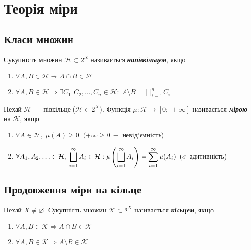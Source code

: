 \newpage
\section{\Large{Теорія міри}}

\subsection{\large{Класи множин}}
\begin{definition}
    Сукупність множин $\mathcal{H} \subset 2^X $ називається \textcolor{NavyBlue}{\textbf{\textit{напівкільцем}}}, якщо
    \begin{enumerate}
        \item $\forall A, B \in \mathcal{H} \Rightarrow  A \cap B \in \mathcal{H}$
        \item $\forall A, B \in \mathcal{H} \Rightarrow \exists C_1, C_2, \dots ,C_n \in \mathcal{H}: \; A \setminus B = \displaystyle\bigsqcup\limits_{i = 1}^n C_i$
    \end{enumerate}
\end{definition}


\begin{definition}
    Нехай $\mathcal{H}\:-$ півкільце ($\mathcal{H} \subset 2^X$). Функція $\mu:\mathcal{H} \rightarrow [0; \: + \infty] $ називається  
    \textcolor{NavyBlue}{\textbf{\textit{мірою}}} на $\mathcal{H}$, якщо
    \begin{enumerate}
        \item $\forall A \in \mathcal{H}, \; \mu (A) \geqslant 0 \;\; (+\infty \geqslant 0 \: -$ невід'ємність)  
        \item $\forall A_1, A_2, .\,.\,. \in \mathcal{H}, \; \displaystyle\bigsqcup\limits_{i = 1}^\infty  A_i \in \mathcal{H}: \mu\left(\displaystyle\bigsqcup\limits_{i = 1}^\infty  A_i\right) =  \displaystyle\sum\limits_{i=1}^{\infty} \mu (A_i) \;\; (\sigma$-адитивність)
    \end{enumerate}
\end{definition}


\subsection{\large{Продовження міри на кільце}}
\begin{definition}
    Нехай $X \neq \varnothing$. Сукупність множин $\mathcal{K} \subset 2^X $ називається \textcolor{NavyBlue}{\textbf{\textit{кільцем}}}, якщо
    \begin{enumerate}
        \item $\forall A, B \in \mathcal{K} \Rightarrow  A \cap B \in \mathcal{K}$
        \item $\forall A, B \in \mathcal{K} \Rightarrow  A \setminus B \in \mathcal{K}$
    \end{enumerate}
\end{definition}

